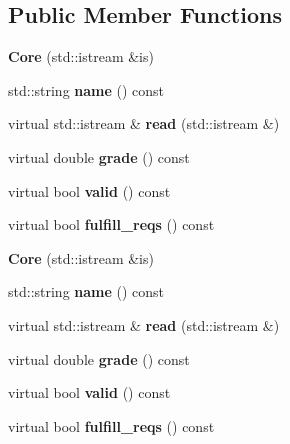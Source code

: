 \subsection*{Public Member Functions}
\begin{DoxyCompactItemize}
\item 
\mbox{\label{classCore_ad1013e09510ddff40c114943de99093f}} 
{\bfseries Core} (std\+::istream \&is)
\item 
\mbox{\label{classCore_a60d51fbac9805972bac7b117af8f1a54}} 
std\+::string {\bfseries name} () const
\item 
\mbox{\label{classCore_a80ab3115704b9152dc014cc8e56b57a0}} 
virtual std\+::istream \& {\bfseries read} (std\+::istream \&)
\item 
\mbox{\label{classCore_a0d609cb4037c6dfe99ce0d68c1d69f04}} 
virtual double {\bfseries grade} () const
\item 
\mbox{\label{classCore_a557816073236f9ed9fa91edbb9cea451}} 
virtual bool {\bfseries valid} () const
\item 
\mbox{\label{classCore_a81f50dc6932b75f6dbd7c9014bf23644}} 
virtual bool {\bfseries fulfill\+\_\+reqs} () const
\item 
\mbox{\label{classCore_ad1013e09510ddff40c114943de99093f}} 
{\bfseries Core} (std\+::istream \&is)
\item 
\mbox{\label{classCore_a60d51fbac9805972bac7b117af8f1a54}} 
std\+::string {\bfseries name} () const
\item 
\mbox{\label{classCore_a80ab3115704b9152dc014cc8e56b57a0}} 
virtual std\+::istream \& {\bfseries read} (std\+::istream \&)
\item 
\mbox{\label{classCore_a0d609cb4037c6dfe99ce0d68c1d69f04}} 
virtual double {\bfseries grade} () const
\item 
\mbox{\label{classCore_a557816073236f9ed9fa91edbb9cea451}} 
virtual bool {\bfseries valid} () const
\item 
\mbox{\label{classCore_a81f50dc6932b75f6dbd7c9014bf23644}} 
virtual bool {\bfseries fulfill\+\_\+reqs} () const
\end{DoxyCompactItemize}
